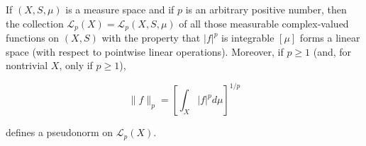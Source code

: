 If $(X, S, \mu)$ is a measure space and if $p$ is an arbitrary positive number, then the collection $\mathcal{L}_p(X) = \mathcal{L}_p(X, S, \mu)$ of all those measurable complex-valued functions on $(X, S)$ with the property that $|f|^p$ is integrable $[\mu]$ forms a linear space (with respect to pointwise linear operations). Moreover, if $p \geq 1$ (and, for nontrivial $X$, only if $p \geq 1$),

$$\|f\|_p = \left[ \int_X |f|^p d\mu \right]^{1/p}$$

defines a pseudonorm on $\mathcal{L}_p(X)$.

